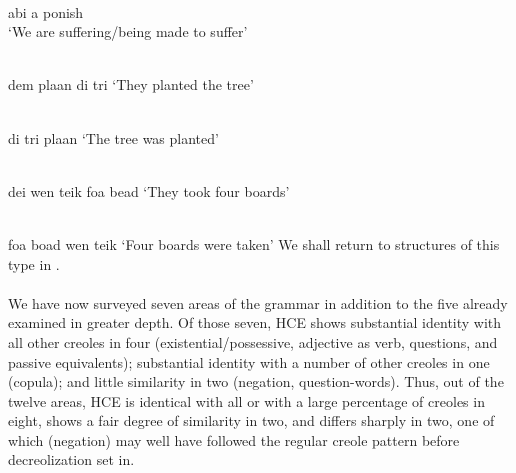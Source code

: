 \ea\label{ex:2:87}
\ili{\langGC}{}{}\\
abi a ponish\\
\glt `We are suffering/being made to suffer'
\z

\ea\label{ex:2:88}
 \ili{\langJC}{}{}\\
  dem plaan di tri
\glt `They planted the tree'
\z

\ea\label{ex:2:89}
\ili{\langJC}{}{}\\
di tri plaan
\glt `The tree was planted'
\z

\ea\label{ex:2:90}
 \ili{\langHCE}{}{}\\
 dei wen teik foa bead
\glt `They took four boards'
\z

\ea\label{ex:2:91}
\ili{\langHCE}{}{}\\
foa boad wen teik
\glt `Four boards were taken'
\z
We shall return to structures of this type in .\\\\

We have now surveyed seven areas of the grammar in addition to the five already examined in greater depth. Of those seven, HCE shows substantial identity with all other creoles in four (existential/possessive, adjective as verb, questions, and passive equivalents); substantial iden\-tity with a number of other creoles in one (copula); and little simi\-larity in two (negation, question-words). Thus, out of the twelve areas, HCE is identical with all or with a large percentage of creoles in eight, shows a fair degree of similarity in two, and differs sharply in two, one of which (negation) may well have followed the regular creole pattern before decreolization set in.

